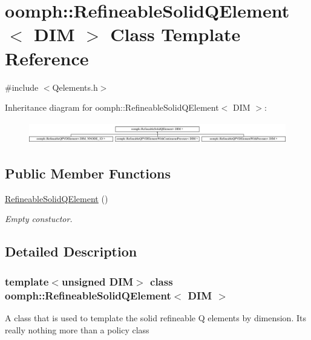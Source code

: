 \hypertarget{classoomph_1_1RefineableSolidQElement}{}\section{oomph\+:\+:Refineable\+Solid\+Q\+Element$<$ D\+IM $>$ Class Template Reference}
\label{classoomph_1_1RefineableSolidQElement}


{\ttfamily \#include $<$Qelements.\+h$>$}

Inheritance diagram for oomph\+:\+:Refineable\+Solid\+Q\+Element$<$ D\+IM $>$\+:\begin{figure}[H]
\begin{center}
\leavevmode
\includegraphics[height=0.962199cm]{classoomph_1_1RefineableSolidQElement}
\end{center}
\end{figure}
\subsection*{Public Member Functions}
\begin{DoxyCompactItemize}
\item 
\hyperlink{classoomph_1_1RefineableSolidQElement_acd42603a0c4015653f722c54d52223ab}{Refineable\+Solid\+Q\+Element} ()
\begin{DoxyCompactList}\small\item\em Empty constuctor. \end{DoxyCompactList}\end{DoxyCompactItemize}


\subsection{Detailed Description}
\subsubsection*{template$<$unsigned D\+IM$>$\newline
class oomph\+::\+Refineable\+Solid\+Q\+Element$<$ D\+I\+M $>$}

A class that is used to template the solid refineable Q elements by dimension. It\textquotesingle{}s really nothing more than a policy class 

